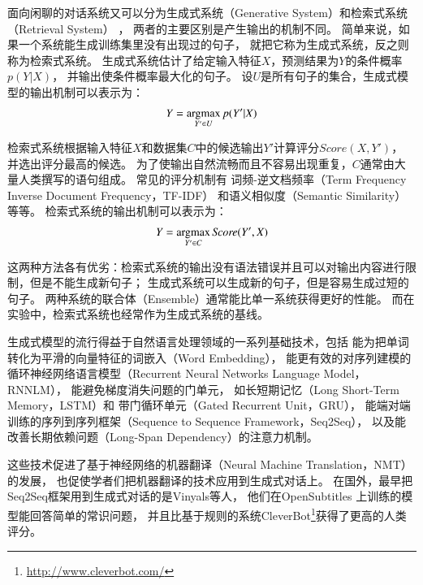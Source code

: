 面向闲聊的对话系统又可以分为生成式系统（Generative System）和检索式系统（Retrieval System）
，
两者的主要区别是产生输出的机制不同。
简单来说，如果一个系统能生成训练集里没有出现过的句子，
就把它称为生成式系统，反之则称为检索式系统。
生成式系统估计了给定输入特征$X$，预测结果为$Y$的条件概率$p(Y|X)$，
并输出使条件概率最大化的句子。
设$U$是所有句子的集合，生成式模型的输出机制可以表示为：
\begin{align}
    Y = \operatorname*{argmax}_{Y'\in U} p(Y'|X)
\end{align}

检索式系统根据输入特征$X$和数据集$C$中的候选输出$Y'$计算评分$\textit{Score}(X, Y')$，
并选出评分最高的候选。
为了使输出自然流畅而且不容易出现重复，$C$通常由大量人类撰写的语句组成。
常见的评分机制有
词频-逆文档频率（Term Frequency Inverse Document Frequency，TF-IDF）
和语义相似度（Semantic Similarity）等等。
检索式系统的输出机制可以表示为：
\begin{align}
    Y = \operatorname*{argmax}_{Y'\in C} \textit{Score}(Y', X)
\end{align}

这两种方法各有优劣：检索式系统的输出没有语法错误并且可以对输出内容进行限制，但是不能生成新句子；
生成式系统可以生成新的句子，但是容易生成过短的句子。
两种系统的联合体（Ensemble）通常能比单一系统获得更好的性能。
而在实验中，检索式系统也经常作为生成式系统的基线。

生成式模型的流行得益于自然语言处理领域的一系列基础技术，包括
能为把单词转化为平滑的向量特征的词嵌入（Word Embedding），
能更有效的对序列建模的循环神经网络语言模型（Recurrent Neural Networks Language Model，RNNLM），
能避免梯度消失问题的门单元，
如长短期记忆（Long Short-Term Memory，LSTM）和
带门循环单元（Gated Recurrent Unit，GRU），
能端对端训练的序列到序列框架（Sequence to Sequence Framework，Seq2Seq），
以及能改善长期依赖问题（Long-Span Dependency）的注意力机制。

这些技术促进了基于神经网络的机器翻译（Neural Machine Translation，NMT）的发展，
也促使学者们把机器翻译的技术应用到生成式对话上。
在国外，最早把Seq2Seq框架用到生成式对话的是Vinyals等人，
他们在OpenSubtitles
上训练的模型能回答简单的常识问题，
并且比基于规则的系统CleverBot\footnote{\url{http://www.cleverbot.com/}}获得了更高的人类评分。


